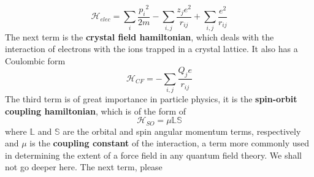 \documentclass[12pt]{article}
\begin{document}
$$\mathcal{H}_{elec} = \sum_i \frac{{p_i}^{2}}{2m} - \sum_{i,j} \frac{z_je^2}{r_{ij}} + \sum_{i,j} \frac{e^2}{r_{ij}}$$
The next term is the \textbf{crystal field hamiltonian}, which deals with the interaction of electrons with the ions trapped in a crystal lattice. It also has a Coulombic form 
$$\mathcal{H}_{CF} = -\sum_{i,j} \frac{Q_je}{r_{ij}}$$
The third term is of great importance in particle physics, it is the \textbf{spin-orbit coupling hamiltonian}, which is of the form of 
$$\mathcal{H}_{SO} = \mu \mathbb{L}\mathbb{S}$$
where $\mathbb{L}$ and $\mathbb{S}$ are the orbital and spin angular momentum terms, respectively and $\mu$ is the \textbf{coupling constant} of the interaction, a term more commonly used in determining the extent of a force field in any quantum field theory. We shall not go deeper here. The next term, please



\end{document}
